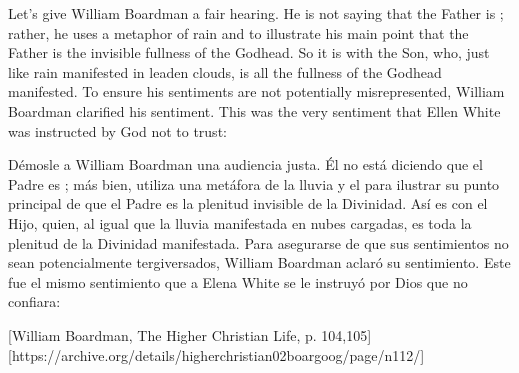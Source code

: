 Let's give William Boardman a fair hearing. He is not saying that the Father is ; rather, he uses a metaphor of rain and  to illustrate his main point that the Father is the invisible fullness of the Godhead. So it is with the Son, who, just like rain manifested in leaden clouds, is all the fullness of the Godhead manifested. To ensure his sentiments are not potentially misrepresented, William Boardman clarified his sentiment. This was the very sentiment that Ellen White was instructed by God not to trust:


Démosle a William Boardman una audiencia justa. Él no está diciendo que el Padre es ; más bien, utiliza una metáfora de la lluvia y el  para ilustrar su punto principal de que el Padre es la plenitud invisible de la Divinidad. Así es con el Hijo, quien, al igual que la lluvia manifestada en nubes cargadas, es toda la plenitud de la Divinidad manifestada. Para asegurarse de que sus sentimientos no sean potencialmente tergiversados, William Boardman aclaró su sentimiento. Este fue el mismo sentimiento que a Elena White se le instruyó por Dios que no confiara:


[William Boardman, The Higher Christian Life, p. 104,105][https://archive.org/details/higherchristian02boargoog/page/n112/]


